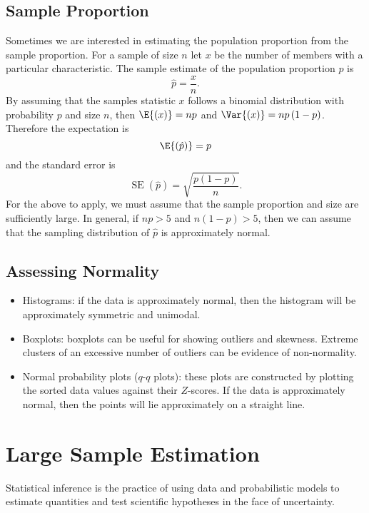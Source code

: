 \documentclass{article}
\begin{document}
\subsection{Sample Proportion}
Sometimes we are interested in estimating the population proportion from the sample proportion.
For a sample of size \(n\) let \(x\) be the number of members with a particular characteristic.
The sample estimate of the population proportion \(p\) is
\begin{equation*}
    \hat{p} = \frac{x}{n}.
\end{equation*}
By assuming that the samples statistic \(x\) follows a binomial distribution with probability \(p\) and
size \(n\), then \(\E{\left( x \right)} = np\) and \(\Var{\left( x \right)} = np\left( 1 - p \right)\).
Therefore the expectation is
\begin{equation*}
    \E{\left( \hat{p} \right)} = p
\end{equation*}
and the standard error is
\begin{equation*}
    \operatorname{SE}{\left( \hat{p} \right)} = \sqrt{\frac{p\left( 1 - p \right)}{n}}.
\end{equation*}
For the above to apply, we must assume that the sample proportion and size are sufficiently large.
In general, if \(np > 5\) and \(n\left( 1 - p \right) > 5\), then we can assume that the sampling distribution of \(\hat{p}\)
is approximately normal.
\subsection{Assessing Normality}
\begin{itemize}
    \item Histograms: if the data is approximately normal, then the histogram will be approximately symmetric and unimodal.
    \item Boxplots: boxplots can be useful for showing outliers and skewness. Extreme clusters of an excessive number of
          outliers can be evidence of non-normality.
    \item Normal probability plots (\(q\)-\(q\) plots): these plots are constructed by plotting the sorted data values against
          their \(Z\)-scores. If the data is approximately normal, then the points will lie approximately on a straight line.
\end{itemize}
\section{Large Sample Estimation}
Statistical inference is the practice of using data and probabilistic models to
estimate quantities and test scientific hypotheses in the face of uncertainty.
\end{document}
